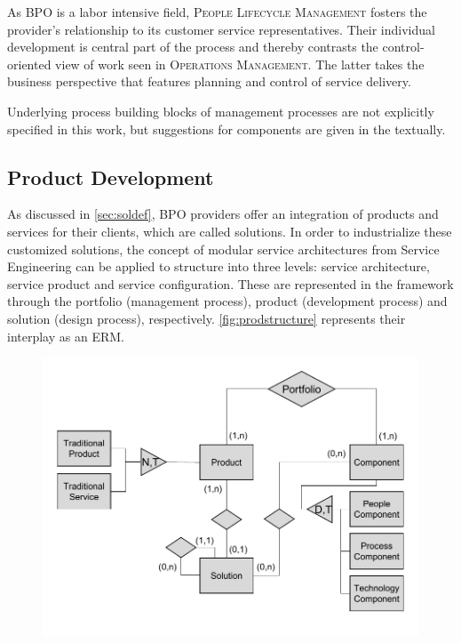 	As \acrshort{BPO} is a labor intensive field, \textsc{People Lifecycle Management} fosters the provider's relationship to its customer service representatives. Their individual development is central part of the process and thereby contrasts the control-oriented view of work seen in \textsc{Operations Management}. The latter takes the business perspective that features planning and control of service delivery.
	
	Underlying process building blocks of management processes are not explicitly specified in this work, but suggestions for components are given in the textually. 
	
	\subsection{Product Development}
	\label{sec:proddev}
	
	As discussed in \ref{sec:soldef}, \acrshort{BPO} providers offer an integration of products and services for their clients, which are called solutions. In order to industrialize these customized solutions, the concept of modular service architectures from Service Engineering \citep{Bohmann2006} can be applied to structure into three levels: service architecture, service product and service configuration. These are represented in the framework through the portfolio (management process), product (development process) and solution (design process), respectively. \Fig \ref{fig:prodstructure} represents their interplay as an \acrshort{ERM}. 
	
	\begin{figure}[caption={Solution-Product-Portfolio Structure }, label={fig:prodstructure}]
		{	\includegraphics[width=.8\textwidth]{figures/producterm.pdf}}
		
	\end{figure} 
	

